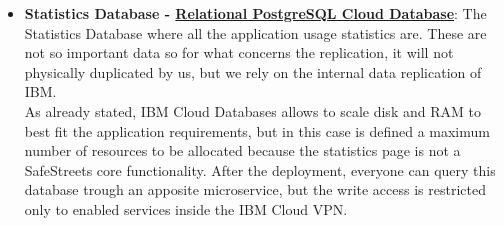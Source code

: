 \begin{itemize}
	\item \textbf{Statistics Database - \href{https://cloud.ibm.com/catalog/services/databases-for-postgresql}{Relational PostgreSQL Cloud Database}}: The Statistics Database where all the application usage statistics are. 
	These are not so important data so for what concerns the replication, it will not physically duplicated by us, but we rely on the internal data replication of IBM.
	\\As already stated, IBM Cloud Databases allows to scale disk and RAM to best fit the application requirements, but in this case is defined a maximum number of resources to be allocated because the statistics page is not a SafeStreets core functionality.
	After the deployment, everyone can query this database trough an apposite microservice, but the write access is restricted only to enabled services inside the IBM Cloud VPN.
	\begin{comment}
	\begin{figure}[h!]
	\makebox[\textwidth]{\texttt{[image: /images/microservices/postgres.png]}}
	\caption{Scalable SafeStreets architecture to handle millions of users.}
	\end{figure}
	\FloatBarrier
	\end{comment}
	
	
\end{itemize}